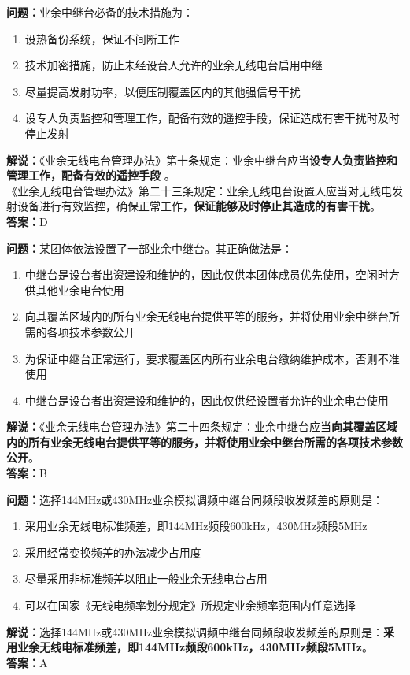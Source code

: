 \documentclass{ctexbook}
\begin{document}
\bigskip


\noindent\textbf{问题：}业余中继台必备的技术措施为：
\begin{enumerate}[label=\Alph*), leftmargin=3em]
	\item 设热备份系统，保证不间断工作
	\item 技术加密措施，防止未经设台人允许的业余无线电台启用中继
	\item 尽量提高发射功率，以便压制覆盖区内的其他强信号干扰
	\item 设专人负责监控和管理工作，配备有效的遥控手段，保证造成有害干扰时及时停止发射
\end{enumerate}
\noindent\textbf{解说：}《业余无线电台管理办法》第十条规定：业余中继台应当\textbf{设专人负责监控和管理工作，配备有效的遥控手段 }。\\
《业余无线电台管理办法》第二十三条规定：业余无线电台设置人应当对无线电发射设备进行有效监控，确保正常工作，\textbf{保证能够及时停止其造成的有害干扰}。 \\\noindent\textbf{答案：}D



\bigskip


\noindent\textbf{问题：}某团体依法设置了一部业余中继台。其正确做法是：
\begin{enumerate}[label=\Alph*), leftmargin=3em]
	\item 中继台是设台者出资建设和维护的，因此仅供本团体成员优先使用，空闲时方供其他业余电台使用
	\item 向其覆盖区域内的所有业余无线电台提供平等的服务，并将使用业余中继台所需的各项技术参数公开
	\item 为保证中继台正常运行，要求覆盖区内所有业余电台缴纳维护成本，否则不准使用
	\item 中继台是设台者出资建设和维护的，因此仅供经设置者允许的业余电台使用
\end{enumerate}
\noindent\textbf{解说：}《业余无线电台管理办法》第二十四条规定：业余中继台应当\textbf{向其覆盖区域内的所有业余无线电台提供平等的服务，并将使用业余中继台所需的各项技术参数公开}。\\\noindent\textbf{答案：}B



\bigskip


\noindent\textbf{问题：}选择144MHz或430MHz业余模拟调频中继台同频段收发频差的原则是：
\begin{enumerate}[label=\Alph*), leftmargin=3em]
	\item 采用业余无线电标准频差，即144MHz频段600kHz，430MHz频段5MHz
	\item 采用经常变换频差的办法减少占用度
	\item 尽量采用非标准频差以阻止一般业余无线电台占用
	\item 可以在国家《无线电频率划分规定》所规定业余频率范围内任意选择
\end{enumerate}
\noindent\textbf{解说：}选择144MHz或430MHz业余模拟调频中继台同频段收发频差的原则是：\textbf{采用业余无线电标准频差，即144MHz频段600kHz，430MHz频段5MHz}。\\\noindent\textbf{答案：}A
\end{document}

